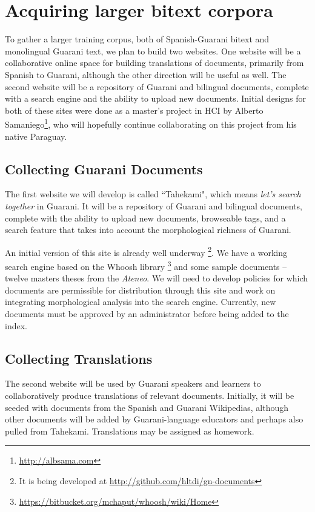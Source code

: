 \section{Acquiring larger bitext corpora}
To gather a larger training corpus, both of Spanish-Guarani bitext and
monolingual Guarani text, we plan to build two websites. One website will be a
collaborative online space for building translations of documents, primarily
from Spanish to Guarani, although the other direction will be useful as well.
The second website will be a repository of Guarani and bilingual documents,
complete with a search engine and the ability to upload new documents.
Initial designs for both of these sites were done as a master's project in HCI
by Alberto Samaniego\footnote{\url{http://albsama.com}}, who will hopefully
continue collaborating on this project from his native Paraguay.

\subsection{Collecting Guarani Documents}
The first website we will develop is called ``Tahekami", which means
\emph{let's search together} in Guarani. It will be a repository of Guarani and
bilingual documents, complete with the ability to upload new documents,
browseable tags, and a search feature that takes into account the morphological
richness of Guarani.

An initial version of this site is already well underway \footnote{It is being
developed at \url{http://github.com/hltdi/gn-documents}}. We have a working
search engine based on the Whoosh library
\footnote{\url{https://bitbucket.org/mchaput/whoosh/wiki/Home}} and some sample
documents -- twelve masters theses from the \emph{Ateneo}.  We will need to
develop policies for which documents are permissible for distribution through
this site and work on integrating morphological analysis into the search
engine. Currently, new documents must be approved by an administrator before
being added to the index.


\subsection{Collecting Translations}
The second website will be used by Guarani speakers and learners to
collaboratively produce translations of relevant documents. Initially, it will
be seeded with documents from the Spanish and Guarani Wikipedias, although
other documents will be added by Guarani-language educators and perhaps also
pulled from Tahekami. Translations may be assigned as homework.

